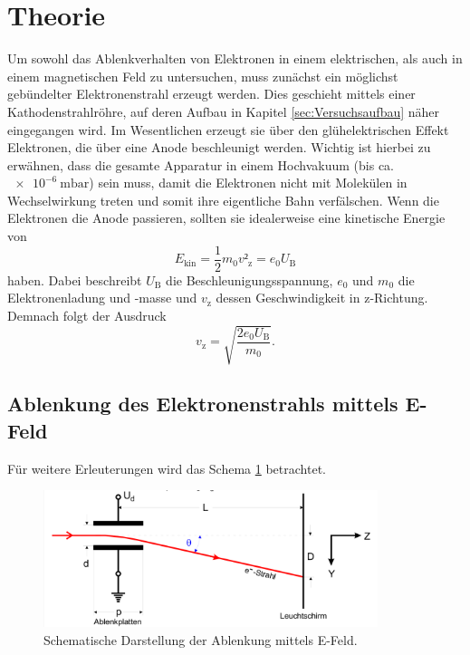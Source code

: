 \section{Theorie}
\label{sec:Theorie}

Um sowohl das Ablenkverhalten von Elektronen in einem elektrischen, als auch in einem magnetischen Feld zu untersuchen, muss zunächst ein möglichst gebündelter Elektronenstrahl erzeugt werden.
Dies geschieht mittels einer Kathodenstrahlröhre, auf deren Aufbau in Kapitel \ref{sec:Versuchsaufbau} näher eingegangen wird.
Im Wesentlichen erzeugt sie über den glühelektrischen Effekt Elektronen, die über eine Anode beschleunigt werden.
Wichtig ist hierbei zu erwähnen, dass die gesamte Apparatur in einem Hochvakuum (bis ca. $\SI{e-6}{\milli\bar}$) sein muss, damit die Elektronen nicht mit Molekülen in Wechselwirkung treten und somit ihre eigentliche Bahn verfälschen.
Wenn die Elektronen die Anode passieren, sollten sie idealerweise eine kinetische Energie von
\begin{equation}
  E_{\text{kin}} = \frac{1}{2}m_0 v²_{\text{z}} = e_0 U_{\text{B}}
\end{equation}
haben.
Dabei beschreibt $U_{\text{B}}$ die Beschleunigungsspannung, $e_0$ und $m_0$ die Elektronenladung und -masse und $v_{\text{z}}$ dessen Geschwindigkeit in z-Richtung.
Demnach folgt der Ausdruck
\begin{equation}
  v_{\text{z}} = \sqrt{\frac{2 e_0 U_{\text{B}}}{m_0}}. \label{eqn:1}
\end{equation}

\subsection{Ablenkung des Elektronenstrahls mittels E-Feld}
Für weitere Erleuterungen wird das Schema \ref{fig:1} betrachtet.

\begin{figure}
  \centering
  \includegraphics[height=4cm]{ressources/schema.png}
  \caption{Schematische Darstellung der Ablenkung mittels E-Feld. \cite{skript}}
  \label{fig:1}
\end{figure}

